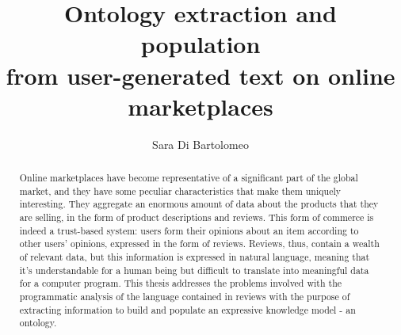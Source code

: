 \documentclass[LaM,binding=0.6cm]{sapthesis}
\title{Ontology extraction and population \\ from user-generated text on online marketplaces}
\author{Sara Di Bartolomeo}
\begin{document}
\frontmatter

\maketitle

\dedication{Dedicato a\\ nonno Lamberto}

\begin{abstract}

Online marketplaces have become representative of a significant part of the global market, and they have some peculiar characteristics that make them uniquely interesting. They aggregate an enormous amount of data about the products that they are selling, in the form of product descriptions and reviews. This form of commerce is indeed a trust-based system: users form their opinions about an item according to other users' opinions, expressed in the form of reviews. Reviews, thus, contain a wealth of relevant data, but this information is expressed in natural language, meaning that it's understandable for a human being but difficult to translate into meaningful data for a computer program. This thesis addresses the problems involved with the programmatic analysis of the language contained in reviews with the purpose of extracting information to build and populate an expressive knowledge model - an ontology.

\end{abstract}
\end{document}

